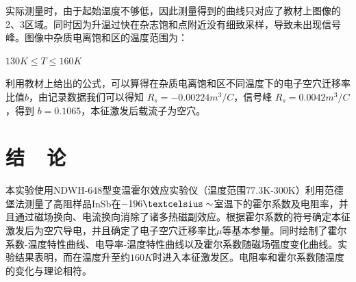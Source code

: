 \documentclass{buaaemp}
\begin{document}
	实际测量时，由于起始温度不够低，因此测量得到的曲线只对应了教材上图像的2、3区域。同时因为升温过快在杂志饱和点附近没有细致采样，导致未出现信号峰。图像中杂质电离饱和区的温度范围为：
	\begin{center}
		$130K\le T\le160K$
	\end{center}
	
	利用教材上给出的公式，可以算得在杂质电离饱和区不同温度下的电子空穴迁移率比值$b$，由记录数据我们可以得知 $R_s=-0.00224 m^3/C$，信号峰 $R_s=0.0042 m^3/C$，得到 $b=0.1065$，本征激发后载流子为空穴。



\section{结~~论}
本实验使用NDWH-648型变温霍尔效应实验仪（温度范围77.3K-300K）利用范德堡法测量了高阻样品InSb在$-196\textcelsius\sim$室温下的霍尔系数及电阻率，并且通过磁场换向、电流换向消除了诸多热磁副效应。根据霍尔系数的符号确定本征激发后为空穴导电，并且确定了电子空穴迁移率比$\mu$等基本参量。同时绘制了霍尔系数-温度特性曲线、电导率-温度特性曲线以及霍尔系数随磁场强度变化曲线。实验结果表明，而在温度升至约$160K$时进入本征激发区。电阻率和霍尔系数随温度的变化与理论相符。


\renewcommand\refname{\heiti\wuhao\centerline{参考文献}\global\def\refname{参考文献}}
\vskip 12pt

\let\OLDthebibliography\thebibliography
\renewcommand\thebibliography[1]{
  \OLDthebibliography{#1}
  \setlength{\parskip}{0pt}
  \setlength{\itemsep}{0pt plus 0.3ex}
}

{
\renewcommand{\baselinestretch}{0.9}
\liuhao


}
\end{document}
